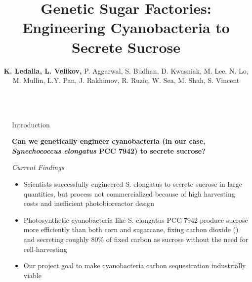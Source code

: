 \documentclass[final]{beamer}
\title{Genetic Sugar Factories: Engineering Cyanobacteria to Secrete Sucrose} %
\author{\textbf{K. Ledalla, L. Velikov,} P. Aggarwal, S. Budhan, D. Kwasniak, M. Lee, N. Lo, M. Mullin, L.Y. Pan, J. Rakhimov, R. Ruzic, W. Sea, M. Shah, S. Vincent} %
\institute{Stony Brook University iGEM Team} %
\newlength{\sepwid}
\newlength{\onecolwid}
\begin{document}

\setlength{\belowcaptionskip}{2ex} %
\setlength\belowdisplayshortskip{2ex} %

\begin{frame}[t] %

\begin{columns}[t] %

\begin{column}{\sepwid}\end{column} %

\begin{column}{\onecolwid} %


\begin{block}{Introduction}

\begin{center}
\textbf{Can we genetically engineer cyanobacteria (in our case, \textit{Synechococcus elongatus} PCC 7942) to secrete sucrose?}
\end{center}

\begin{center}
\textit{Current Findings}
\end{center}

\begin{itemize}
\item Scientists successfully engineered S. elongatus to secrete sucrose in large quantities, but process not commercialized because of high harvesting costs and inefficient photobioreactor design \cite{Qiao:2017jd}
\item Photosynthetic cyanobacteria like S. elongatus PCC 7942 produce sucrose more efficiently than both corn and sugarcane, fixing carbon dioxide () and secreting roughly 80\% of fixed carbon as sucrose without the need for cell-harvesting \cite{Ducat:2012jd}
\item Our project goal to make cyanobacteria carbon sequestration industrially viable
\end{itemize}


\end{block}
\end{column}
\end{columns}
\end{frame}
\end{document}
